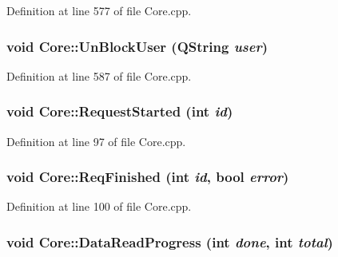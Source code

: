 Definition at line 577 of file Core.cpp.\hypertarget{classCore_abc783553ec1e543435b8dc06f64939f}{
\subsubsection{\setlength{\rightskip}{0pt plus 5cm}void Core::UnBlockUser (QString {\em user})}}
\label{classCore_abc783553ec1e543435b8dc06f64939f}




Definition at line 587 of file Core.cpp.\hypertarget{classCore_2e3b63ac22f8fef5f2d2d5e9adc42cdd}{
\subsubsection{\setlength{\rightskip}{0pt plus 5cm}void Core::RequestStarted (int {\em id})}}
\label{classCore_2e3b63ac22f8fef5f2d2d5e9adc42cdd}




Definition at line 97 of file Core.cpp.\hypertarget{classCore_7b649f8d3aeae37e3f2e0eff65ab189f}{
\subsubsection{\setlength{\rightskip}{0pt plus 5cm}void Core::ReqFinished (int {\em id}, \/  bool {\em error})}}
\label{classCore_7b649f8d3aeae37e3f2e0eff65ab189f}




Definition at line 100 of file Core.cpp.\hypertarget{classCore_77844f4e1b5e81ff4a13bc22328a4258}{
\subsubsection{\setlength{\rightskip}{0pt plus 5cm}void Core::DataReadProgress (int {\em done}, \/  int {\em total})}}
\label{classCore_77844f4e1b5e81ff4a13bc22328a4258}




